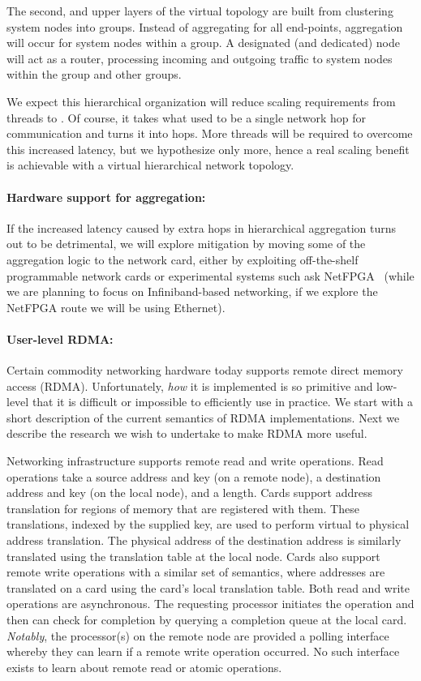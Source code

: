 The second, and upper layers of the virtual topology are built from clustering system nodes into groups.  Instead of aggregating for all end-points, aggregation will occur for system nodes within a group.  A designated (and dedicated) node will act as a router, processing incoming and outgoing traffic to system nodes within the group and other groups.

We expect this hierarchical organization will reduce scaling requirements from
 threads to . Of course, it takes what used to
be a single network hop for communication and turns it into 
hops. More threads will be required to overcome this increased latency, but we
hypothesize only  more, hence a real  scaling
benefit is achievable with a virtual hierarchical network topology. 

\paragraph{Hardware support for aggregation:} If the increased latency caused
by extra hops in hierarchical aggregation turns out to be detrimental, we
will explore mitigation by moving some of the aggregation logic to the network
card, either by exploiting off-the-shelf programmable network cards or
experimental systems such ask NetFPGA~\cite{netfpga} (while we are planning to
focus on Infiniband-based networking, if we explore the NetFPGA route we will
be using Ethernet).

\paragraph{User-level RDMA:} Certain commodity networking hardware today
supports remote direct memory access (RDMA). Unfortunately, \emph{how} it is
implemented is so primitive and low-level that it is difficult or impossible
to efficiently use in practice. We start with a short description of the
current semantics of RDMA implementations. Next we describe the research we
wish to undertake to make RDMA more useful.

Networking infrastructure supports remote read and write operations.  Read operations take a source address and key (on a remote node), a destination address and key (on the local node), and a length.  Cards support address translation for regions of memory that are registered with them.  These translations, indexed by the supplied key, are used to perform virtual to physical address translation.  The physical address of the destination address is similarly translated using the translation table at the local node.  Cards also support remote write operations with a similar set of semantics, where addresses are translated on a card using the card's local translation table.  Both read and write operations are asynchronous.  The requesting processor initiates the operation and then can check for completion by querying a completion queue at the local card.  \emph{Notably}, the processor(s) on the remote node are provided a polling interface whereby they can learn if a remote write operation occurred.  No such interface exists to learn about remote read or atomic operations.

